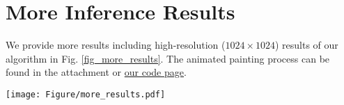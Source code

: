 \documentclass[10pt,twocolumn,letterpaper]{article}
\begin{document}
\section{More Inference Results}
We provide more results including high-resolution ($1024\times1024$) results of our algorithm in Fig. \ref{fig_more_results}. 
The animated painting process can be found in the attachment or \href{https://github.com/Huage001/PaintTransformer}{our code page}.

\begin{figure*}[b]
\begin{center}
\texttt{[image: Figure/more\_results.pdf]}
\end{center}
\caption{More inference result.}
\label{fig_more_results}
\end{figure*}
\end{document}
